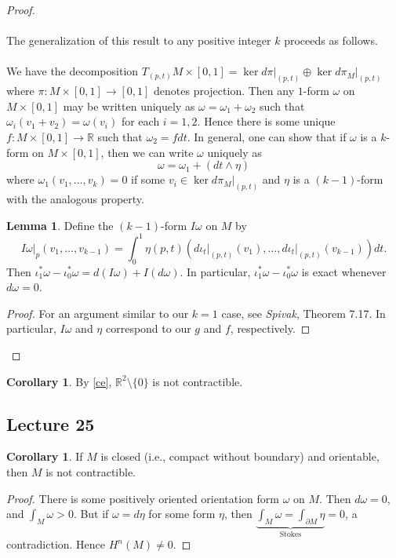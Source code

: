 \documentclass[10pt,letterpaper,cm]{nupset}
\theoremstyle{definition}
\theoremstyle{theorem}
\newtheorem{lemma}[definition]{Lemma}
\newtheorem{corollary}[definition]{Corollary}
\theoremstyle{remark}
\newcommand{\R}{\mathbb R}
\newcommand{\1}{\mathbf{1}}
\newcommand{\0}{\vec 0}
\begin{document}
\begin{proof}
\\ \\
The generalization of this result to any positive integer $k$ proceeds as follows.
\\ \\
We have the decomposition $T_{(p,t)}M \times [0,1] = \ker d\pi\rvert_{(p,t)} \oplus \ker d\pi_M\rvert_{(p,t)}$ where $\pi: M \times [0,1]\to [0,1]$ denotes projection. Then any $1$-form $\omega$ on $M \times [0,1]$ may be written uniquely as $\omega = \omega_1 + \omega_2$ such that $\omega_i(v_1 + v_2) = \omega(v_i)$ for each $i=1, 2$. Hence there is some unique $f : M \times [0,1] \to \R$ such that $\omega_2 = f dt$. In general, one can show that if $\omega$ is a $k$-form on $M \times [0,1]$, then we can write $\omega$ uniquely as $$\omega = \omega_1 + (dt \wedge \eta)$$ where $\omega_1(v_1, \ldots, v_k) =0$ if some $v_i \in  \ker d\pi_M\rvert_{(p,t)}$ and $\eta$ is a $(k-1)$-form with the analogous property.
\begin{lemma}\label{exact}
Define the $(k-1)$-form $I\omega$ on $M$ by $$I \omega \rvert_p(v_1, \ldots, v_{k-1}) = \int_0^1 \eta(p, t)(d\iota_t\rvert_{(p,t)}(v_1), \ldots, d\iota_t\rvert_{(p,t)}(v_{k-1}))dt   .$$ Then $\iota^{\ast}_1\omega  - \iota^{\ast}_0 \omega = d(I\omega) + I(d\omega)$. In particular, $\iota^{\ast}_1\omega  - \iota^{\ast}_0 \omega$ is exact whenever $d\omega =0$.
\end{lemma}
\begin{proof}
For an argument similar to our $k=1$ case,  see \textit{Spivak}, Theorem 7.17. In particular, $I\omega$ and $\eta$ correspond to our $g$ and $f$, respectively.
\end{proof}

\end{proof}

\begin{corollary}
By \cref{ce}, $\R^2\setminus \{0\}$ is not contractible.
\end{corollary}

\subsection{Lecture 25}

\begin{corollary}
If $M$ is closed (i.e., compact without boundary) and orientable, then $M$ is not contractible.
\end{corollary}
\begin{proof}
There is some positively oriented orientation form $\omega$ on $M$. Then $d\omega =0$, and $\int_M \omega >0$. But if $\omega = d \eta$ for some form $\eta$, then $\underbrace{\int_M \omega =  \int_{\partial{M}} \eta}_{\text{Stokes}} =0$, a contradiction. Hence $H^n(M) \ne 0$.
\end{proof}
\end{document}

